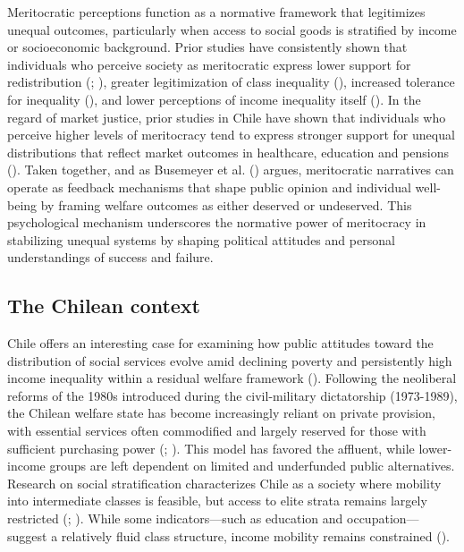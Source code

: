 \documentclass[
  12pt,
]{article}
\begin{document}
Meritocratic perceptions function as a normative framework that
legitimizes unequal outcomes, particularly when access to social goods
is stratified by income or socioeconomic background. Prior studies have
consistently shown that individuals who perceive society as meritocratic
express lower support for redistribution
(;
), greater legitimization of class inequality
(), increased
tolerance for inequality (), and lower perceptions of income inequality itself
(). In the
regard of market justice, prior studies in Chile have shown that
individuals who perceive higher levels of meritocracy tend to express
stronger support for unequal distributions that reflect market outcomes
in healthcare, education and pensions
().
Taken together, and as Busemeyer et al.
() argues, meritocratic
narratives can operate as feedback mechanisms that shape public opinion
and individual well-being by framing welfare outcomes as either deserved
or undeserved. This psychological mechanism underscores the normative
power of meritocracy in stabilizing unequal systems by shaping political
attitudes and personal understandings of success and failure.

\subsection{The Chilean context}\label{the-chilean-context}

Chile offers an interesting case for examining how public attitudes
toward the distribution of social services evolve amid declining poverty
and persistently high income inequality within a residual welfare
framework (). Following
the neoliberal reforms of the 1980s introduced during the civil-military
dictatorship (1973-1989), the Chilean welfare state has become
increasingly reliant on private provision, with essential services often
commodified and largely reserved for those with sufficient purchasing
power (;
). This model has
favored the affluent, while lower-income groups are left dependent on
limited and underfunded public alternatives. Research on social
stratification characterizes Chile as a society where mobility into
intermediate classes is feasible, but access to elite strata remains
largely restricted
(; ).
While some indicators---such as education and occupation---suggest a
relatively fluid class structure, income mobility remains constrained
().
\end{document}
